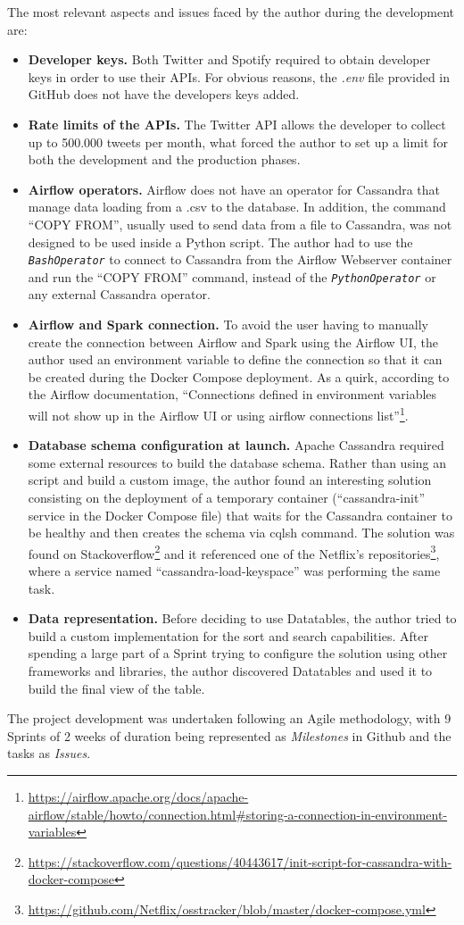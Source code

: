 \nonzeroparskip The most relevant aspects and issues faced by the author during the development are:
\begin{itemize}
	\item \textbf{Developer keys.} Both Twitter and Spotify required to obtain developer keys in order to use their APIs. For obvious reasons, the \textit{.env} file provided in GitHub does not have the developers keys added.
	\item \textbf{Rate limits of the APIs.} The Twitter API allows the developer to collect up to 500.000 tweets per month, what forced the author to set up a limit for both the development and the production phases.
	\item \textbf{Airflow operators.} Airflow does not have an operator for Cassandra that manage data loading from a .csv to the database. In addition, the command ``COPY FROM'', usually used to send data from a file to Cassandra, was not designed to be used inside a Python script. The author had to use the \texttt{\textit{BashOperator}} to connect to Cassandra from the Airflow Webserver container and run the ``COPY FROM'' command, instead of the \texttt{\textit{PythonOperator}} or any external Cassandra operator.
	\item \textbf{Airflow and Spark connection.} To avoid the user having to manually create the connection between Airflow and Spark using the Airflow UI, the author used an environment variable to define the connection so that it can be created during the Docker Compose deployment. As a quirk, according to the Airflow documentation, ``Connections defined in environment variables will not show up in the Airflow UI or using airflow connections list''\footnote{\url{https://airflow.apache.org/docs/apache-airflow/stable/howto/connection.html\#storing-a-connection-in-environment-variables}}.
	\item \textbf{Database schema configuration at launch.} Apache Cassandra required some external resources to build the database schema. Rather than using an script and build a custom image, the author found an interesting solution consisting on the deployment of a temporary container (``cassandra-init'' service in the Docker Compose file) that waits for the Cassandra container to be healthy and then creates the schema via cqlsh command. The solution was found on Stackoverflow\footnote{\url{https://stackoverflow.com/questions/40443617/init-script-for-cassandra-with-docker-compose}} and it referenced one of the Netflix's repositories\footnote{\url{https://github.com/Netflix/osstracker/blob/master/docker-compose.yml}}, where a service named ``cassandra-load-keyspace'' was performing the same task.
	\item \textbf{Data representation.} Before deciding to use Datatables, the author tried to build a custom implementation for the sort and search capabilities. After spending a large part of a Sprint trying to configure the solution using other frameworks and libraries, the author discovered Datatables and used it to build the final view of the table.
\end{itemize}

\nonzeroparskip The project development was undertaken following an Agile methodology, with 9 Sprints of 2 weeks of duration being represented as \textit{Milestones} in Github and the tasks as \textit{Issues}.